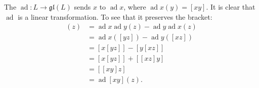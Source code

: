 The  $\operatorname{ad}: L \rightarrow \mathfrak{gl}(L)$ sends $x$ to $\operatorname{ad} x$, where $\operatorname{ad} x(y) = [xy]$. It is clear that $\operatorname{ad}$ is a linear transformation. To see that it preserves the bracket:
\begin{align*}
[\operatorname{ad} x, \operatorname{ad} y](z) &= \operatorname{ad} x \operatorname{ad} y(z) - \operatorname{ad} y \operatorname{ad} x(z) \\
&= \operatorname{ad} x([yz]) - \operatorname{ad} y([xz]) \\
&= [x[yz]] - [y[xz]] \\
&= [x[yz]] + [[xz]y] \\
&= [[xy]z] \\
&= \operatorname{ad}[xy](z).
\end{align*}
